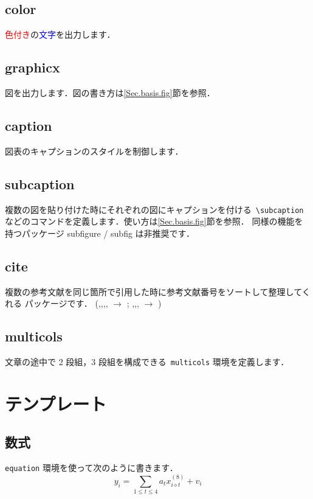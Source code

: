 \documentclass[dvipdfmx,disablejfam,nosetpagesize,12pt]{jsbook}
\begin{document}
\subsection*{color}
\textcolor{red}{色付き}の\textcolor{blue}{文字}を\textcolor[rgb]{0,0.5,0}{出力}します．

\subsection*{graphicx}
図を出力します．図の書き方は\ref{Sec.basis.fig}節を参照．

\subsection*{caption}
図表のキャプションのスタイルを制御します．

\subsection*{subcaption}
複数の図を貼り付けた時にそれぞれの図にキャプションを付ける\ \verb+\subcaption+
などのコマンドを定義します．使い方は\ref{Sec.basis.fig}節を参照．
同様の機能を持つパッケージ subfigure / subfig は非推奨です．

\subsection*{cite}
複数の参考文献を同じ箇所で引用した時に参考文献番号をソートして整理してくれる
パッケージです．
(\cite{Keys1981},\cite{Hou1978},\cite{Jensen1995},\cite{Xin2000},
\cite{Muresan2004}
$\rightarrow$ \cite{Keys1981,Hou1978,Jensen1995,Xin2000,Muresan2004};
\cite{Hou1978},\cite{Carey1999},\cite{Zhang2006},\cite{Muresan2004}
$\rightarrow$ \cite{Hou1978,Carey1999,Zhang2006,Muresan2004,Yoneji2005,Takagi2016})

\subsection*{multicols}
文章の途中で 2 段組，3 段組を構成できる\ \verb+multicols+ 環境を定義します．

\section{テンプレート}

\subsection{数式}
\verb+equation+ 環境を使って次のように書きます．
\begin{equation}
   y_i = \sum_{1\leq t\leq 4} a_t x_{i\diamond t}^{(8)} + v_i
   \label{eq:singleline}
\end{equation}
\end{document}
